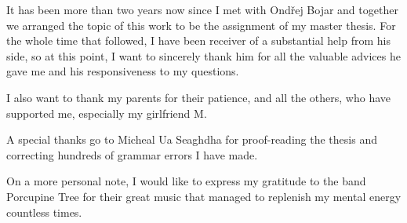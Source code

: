 It has been more than two years now since I met with Ondřej Bojar and together
we arranged the topic of this work to be the assignment of my master thesis.
For the whole time that followed, I have been receiver of a substantial help
from his side, so at this point, I want to sincerely thank him for all the
valuable advices he gave me and his responsiveness to my questions.

I also want to thank my parents for their patience, and all the others, who have
supported me, especially my girlfriend M.

A special thanks go to Micheal Ua Seaghdha for proof-reading the thesis and
correcting hundreds of grammar errors I have made.

On a more personal note, I would like to express my gratitude to the band Porcupine Tree
for their great music that managed to replenish my mental energy countless times.
